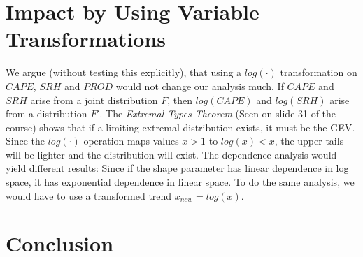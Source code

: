 \documentclass[10pt,conference,compsocconf]{IEEEtran}
\begin{document}
\section*{Impact by Using Variable Transformations}
We argue (without testing this explicitly), that using a $log(\cdot)$ transformation on $CAPE$, $SRH$ and $PROD$ would not change our analysis much. If $CAPE$ and $SRH$ arise from a joint distribution $F$, then $log(CAPE)$ and $log(SRH)$ arise from a distribution $F'$. The \textit{Extremal Types Theorem} (Seen on slide 31 of the course) shows that if a limiting extremal distribution exists, it must be the GEV. Since the $log(\cdot)$ operation maps values $x>1$ to $log(x)<x$, the upper tails will be lighter and the distribution will exist. The dependence analysis would yield different results: Since if the shape parameter has linear dependence in log space, it has exponential dependence in linear space. To do the same analysis, we would have to use a transformed trend $x_{new}= log(x)$. 

\section*{Conclusion}







	
\end{document}
